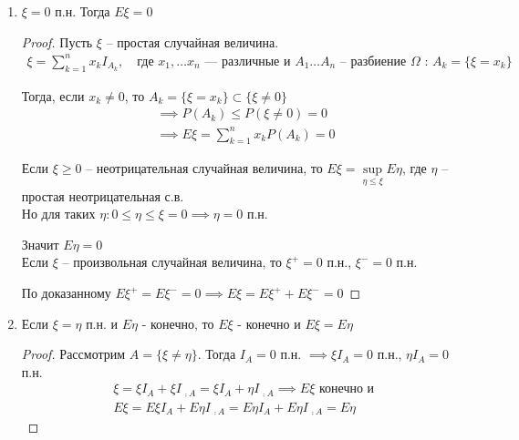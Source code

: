 \begin{enumerate}[resume*=mean_properties]

  \item
    $\xi = 0$ п.н. Тогда $E \xi = 0$

    \begin{proof}
      Пусть $\xi$ -- простая случайная величина.
      \begin{align*}
        \xi = \sum_{k = 1}^{n} x_k I_{A_k}, \quad 
        \text{где $x_1, \ldots x_n$ --- различные и $A_1 \ldots A_n$ --
        разбиение $\Omega$ : $A_k = \{ \xi = x_k \}$}
      \end{align*}

      Тогда, если $x_k \neq 0$, то $A_k = \{ \xi = x_k \} \subset \{ \xi \neq 0 \}$
      \begin{align*}
        &\implies P(A_k) \leq P(\xi \neq 0) = 0\\
        &\implies E \xi = \sum_{k = 1}^{n} x_k P(A_k) = 0
      \end{align*}

      Если $\xi \geq 0$ -- неотрицательная случайная величина, то 
      $E \xi = \sup\limits_{\eta \leq \xi} E \eta$, где $\eta$ -- простая неотрицательная с.в.\\
      Но для таких $\eta: 0 \leq \eta \leq \xi = 0 \implies \eta = 0$ п.н.

      Значит $E \eta = 0$\\

      Если $\xi$ -- произвольная случайная величина, то $\xi^+ = 0$ п.н., $\xi^- = 0$ п.н.

      По доказанному $E \xi^+ = E \xi^- = 0 \implies E \xi = E \xi^+ + E \xi^- = 0$
    \end{proof}

  \item
    Если $\xi = \eta$ п.н. и $E \eta$ - конечно, то $E \xi$ - конечно и $E \xi = E \eta$

    \begin{proof}
      Рассмотрим $A = \{\xi \neq \eta\}$. Тогда $I_A = 0$ п.н. $\implies \xi I_A = 0$ п.н.,
      $\eta I_A = 0$ п.н.
      \begin{align*}
        &\xi = \xi I_A + \xi I_{\,\comp{A}} = \xi I_A + \eta I_{\,\comp{A}} 
        \implies E \xi \text{ конечно и }\\
        &E \xi = E \xi I_A + E \eta I_{\,\comp{A}} = E \eta I_A + E \eta I_{\,\comp{A}} = E \eta
      \end{align*}
    \end{proof}


\end{enumerate}
